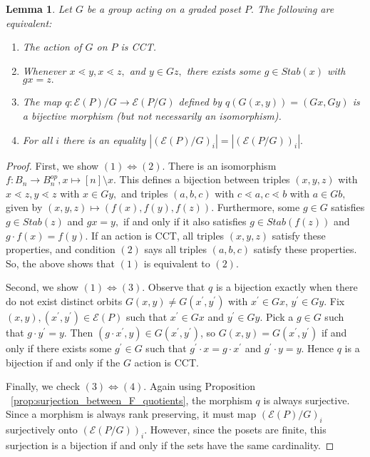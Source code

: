 \documentclass[10 pt]{amsart}
\theoremstyle{plain}
\newtheorem{lem}[thm]{Lemma}
\theoremstyle{definition}
\theoremstyle{remark}
\numberwithin{equation}{section}
\renewcommand{\iff}{\Leftrightarrow}
\begin{document}
\begin{lem}
\label{lem:cover_transitive_equivalence}
Let $G$ be a group acting on a graded poset $P.$ The following are equivalent:
\begin{enumerate}
	\item The action of $G$ on $P$ is CCT.
	\item Whenever $x \lessdot y,x \lessdot z,$ and $y \in Gz,$ there exists some $g \in Stab(x)$ with $gx = z.$
	\item The map $q\colon \mathcal E(P)/G\rightarrow \mathcal E(P/G)$ defined by $q(G(x, y)) = (Gx,Gy)$ is a bijective morphism (but not necessarily an isomorphism).
	\item For all $i$ there is an equality $|(\mathcal E(P)/G)_i|=| (\mathcal E(P/G))_i|.$
\end{enumerate}
\end{lem}
\begin{proof}
First, we show $(1) \iff (2).$ There is an isomorphism $f:B_n \rightarrow B_n^{op},x \mapsto [n]\setminus x.$ This defines a bijection between triples $(x,y,z)$ with $x \lessdot z,y \lessdot z$ with $x \in Gy,$ and triples $(a,b,c)$ with $c \lessdot a, c \lessdot b$ with $a \in Gb,$ given by $(x,y,z)\mapsto (f(x),f(y),f(z)).$ Furthermore, some $g \in G$ satisfies $g \in Stab(z)$ and $gx = y,$ if and only if it also satisfies $g \in Stab(f(z))$ and $g\cdot f(x) = f(y).$ If an action is CCT, all triples $(x,y,z)$ satisfy these properties, and condition $(2)$ says all triples $(a,b,c)$ satisfy these properties. So, the above shows that $(1)$ is equivalent to $(2).$

Second, we show $(1) \iff (3)$. Observe that $q$ is a bijection exactly when there do not exist distinct orbits $G(x, y) \ne G(x^\prime, y^\prime)$ with $x^\prime\in Gx$, $y^\prime\in Gy$.  Fix $(x, y), (x^\prime, y^\prime)\in \mathcal E(P)$ such that $x^\prime\in Gx$ and $y^\prime\in Gy$.  Pick a $g\in G$ such that $g\cdot y^\prime = y$.  Then $(g\cdot x^\prime, y)\in G(x^\prime, y^\prime)$, so $G(x, y) = G(x^\prime, y^\prime)$ if and only if there exists some $g^\prime\in G$ such that $g^\prime\cdot x = g\cdot x^\prime$ and $g^\prime\cdot y = y$. Hence $q$ is a bijection if and only if the $G$ action is CCT.


Finally, we check $(3)\iff (4).$ Again using Proposition ~\ref{prop:surjection_between_F_quotients}, the morphism $q$ is always surjective. Since a morphism is always rank preserving, it must map $(\mathcal E(P)/G)_i$ surjectively onto $(\mathcal E(P/G))_i.$ However, since the posets are finite, this surjection is a bijection if and only if the sets have the same cardinality.
\end{proof}
\end{document}
